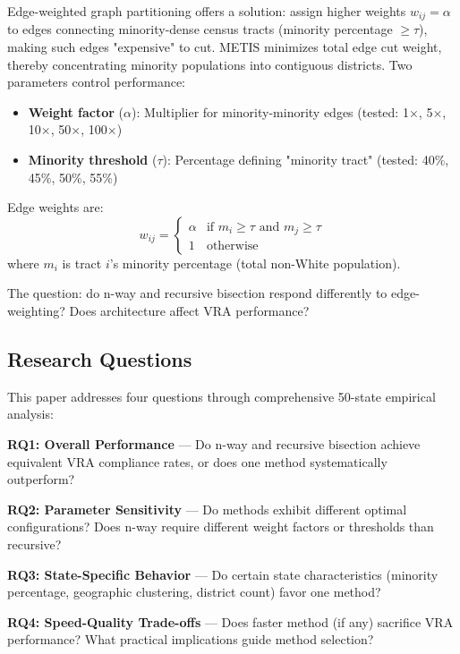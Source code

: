 Edge-weighted graph partitioning offers a solution: assign higher weights $w_{ij} = \alpha$ to edges connecting minority-dense census tracts (minority percentage $\geq \tau$), making such edges "expensive" to cut. METIS minimizes total edge cut weight, thereby concentrating minority populations into contiguous districts. Two parameters control performance:

\begin{itemize}
\item \textbf{Weight factor} ($\alpha$): Multiplier for minority-minority edges (tested: 1$\times$, 5$\times$, 10$\times$, 50$\times$, 100$\times$)
\item \textbf{Minority threshold} ($\tau$): Percentage defining "minority tract" (tested: 40\%, 45\%, 50\%, 55\%)
\end{itemize}

Edge weights are:
\begin{equation}
w_{ij} = \begin{cases}
\alpha & \text{if } m_i \geq \tau \text{ and } m_j \geq \tau \\
1 & \text{otherwise}
\end{cases}
\end{equation}
where $m_i$ is tract $i$'s minority percentage (total non-White population).

The question: do n-way and recursive bisection respond differently to edge-weighting? Does architecture affect VRA performance?

\subsection{Research Questions}

This paper addresses four questions through comprehensive 50-state empirical analysis:

\textbf{RQ1: Overall Performance} — Do n-way and recursive bisection achieve equivalent VRA compliance rates, or does one method systematically outperform?

\textbf{RQ2: Parameter Sensitivity} — Do methods exhibit different optimal configurations? Does n-way require different weight factors or thresholds than recursive?

\textbf{RQ3: State-Specific Behavior} — Do certain state characteristics (minority percentage, geographic clustering, district count) favor one method?

\textbf{RQ4: Speed-Quality Trade-offs} — Does faster method (if any) sacrifice VRA performance? What practical implications guide method selection?

